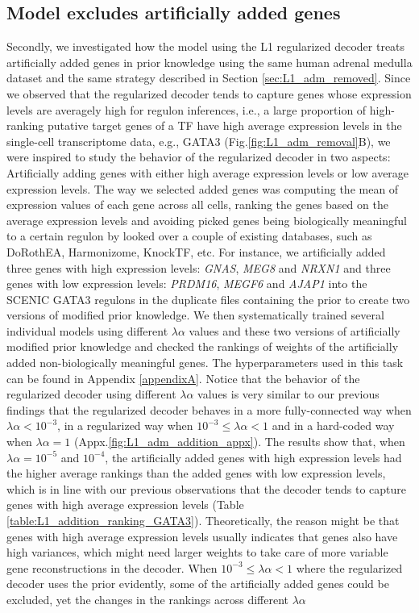 \subsection{Model excludes artificially added genes}\label{sec:L1_adm_added}
Secondly, we investigated how the model using the L1 regularized decoder treats artificially added genes in prior knowledge using the same human adrenal medulla dataset\cite{Jansky2021} and the same strategy described in Section \ref{sec:L1_adm_removed}. Since we observed that the regularized decoder tends to capture genes whose expression levels are averagely high for regulon inferences, i.e., a large proportion of high-ranking putative target genes of a TF have high average expression levels in the single-cell transcriptome data, e.g., GATA3 (Fig.\ref{fig:L1_adm_removal}B), we were inspired to study the behavior of the regularized decoder in two aspects: Artificially adding genes with either high average expression levels or low average expression levels. The way we selected added genes was computing the mean of expression values of each gene across all cells, ranking the genes based on the average expression levels and avoiding picked genes being biologically meaningful to a certain regulon by looked over a couple of existing databases, such as DoRothEA\cite{Garcia-Alonso2019}, Harmonizome\cite{Rouillard2016}, KnockTF\cite{Feng2020}, etc. For instance, we artificially added three genes with high expression levels: \textit{GNAS}, \textit{MEG8} and \textit{NRXN1} and three genes with low expression levels: \textit{PRDM16}, \textit{MEGF6} and \textit{AJAP1} into the SCENIC GATA3 regulons in the duplicate files containing the prior to create two versions of modified prior knowledge. We then systematically trained several individual models using different $\lambda\alpha$ values and these two versions of artificially modified prior knowledge and checked the rankings of weights of the artificially added non-biologically meaningful genes. The hyperparameters used in this task can be found in Appendix \ref{appendixA}. Notice that the behavior of the regularized decoder using different $\lambda\alpha$ values is very similar to our previous findings that the regularized decoder behaves in a more fully-connected way when $\lambda\alpha < 10^{-3}$, in a regularized way when $10^{-3} \leq \lambda\alpha < 1$ and in a hard-coded way when $\lambda\alpha = 1$ (Appx.\ref{fig:L1_adm_addition_appx}). The results show that, when $\lambda\alpha = 10^{-5}$ and $10^{-4}$, the artificially added genes with high expression levels had the higher average rankings than the added genes with low expression levels, which is in line with our previous observations that the decoder tends to capture genes with high average expression levels (Table \ref{table:L1_addition_ranking_GATA3}). Theoretically, the reason might be that genes with high average expression levels usually indicates that genes also have high variances, which might need larger weights to take care of more variable gene reconstructions in the decoder. When $10^{-3} \leq \lambda\alpha < 1$ where the regularized decoder uses the prior evidently, some of the artificially added genes could be excluded, yet the changes in the rankings across different $\lambda\alpha$ 